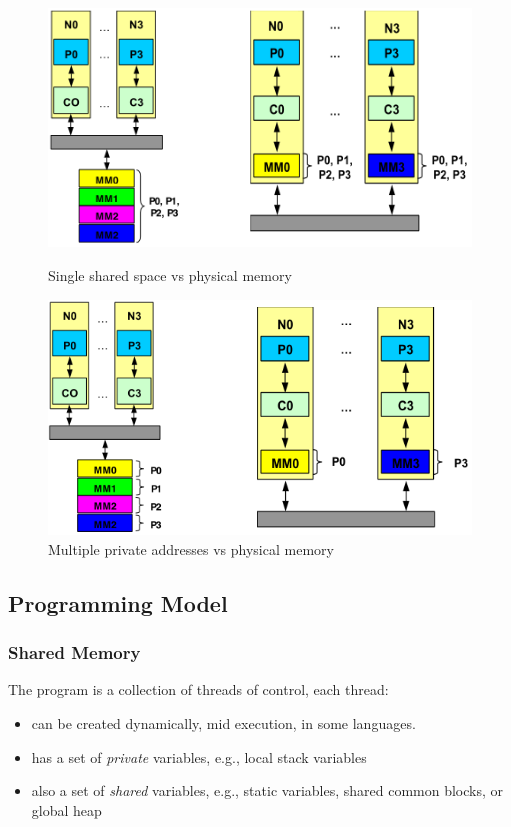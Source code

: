 \begin{figure}[h]
    \centering
    \includegraphics[scale = 0.43]{images/address-space-vs-physical-memory-org}
    \caption{Single shared space vs physical memory}
    \includegraphics[scale = 0.40]{images/address-space-vs-physical-memory-org-1}
    \caption{Multiple private addresses vs physical memory }
    \label{fig:address-space-vs-physical-memory-org}
\end{figure}


\subsection{Programming Model}\label{subsec:programming-model}

\subsubsection{Shared Memory}
The program is a collection of threads of control, each thread:
\begin{itemize}
    \item can be created dynamically, mid execution, in some languages.
    \item has a set of \textit{private} variables, e.g., local stack variables
    \item also a set of \textit{shared} variables, e.g., static variables, shared common blocks, or global heap
\end{itemize}

